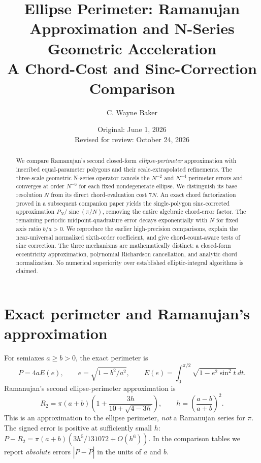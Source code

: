 \documentclass[11pt]{article}
\title{Ellipse Perimeter: Ramanujan Approximation and N-Series Geometric Acceleration\\\large A Chord-Cost and Sinc-Correction Comparison}
\author{C. Wayne Baker}
\date{Original: June 1, 2026\\Revised for review: October 24, 2026}
\begin{document}
\maketitle
\begin{abstract}
We compare Ramanujan's second closed-form \emph{ellipse-perimeter} approximation with inscribed equal-parameter polygons and their scale-extrapolated refinements. The three-scale geometric N-series operator cancels the $N^{-2}$ and $N^{-4}$ perimeter errors and converges at order $N^{-6}$ for each fixed nondegenerate ellipse. We distinguish its base resolution $N$ from its direct chord-evaluation cost $7N$. An exact chord factorization proved in a subsequent companion paper yields the single-polygon sinc-corrected approximation $P_N/\operatorname{sinc}(\pi/N)$, removing the entire algebraic chord-error factor. The remaining periodic midpoint-quadrature error decays exponentially with $N$ for fixed axis ratio $b/a>0$. We reproduce the earlier high-precision comparisons, explain the near-universal normalized sixth-order coefficient, and give chord-count-aware tests of sinc correction. The three mechanisms are mathematically distinct: a closed-form eccentricity approximation, polynomial Richardson cancellation, and analytic chord normalization. No numerical superiority over established elliptic-integral algorithms is claimed.
\end{abstract}
\section{Exact perimeter and Ramanujan's approximation}
For semiaxes $a\ge b>0$, the exact perimeter is
\begin{equation}\label{eq:exact}
P=4aE(e),\qquad e=\sqrt{1-b^2/a^2},\qquad E(e)=\int_0^{\pi/2}\sqrt{1-e^2\sin^2 t}\,dt.
\end{equation}
Ramanujan's second ellipse-perimeter approximation is
\begin{equation}\label{eq:ram}
R_2=\pi(a+b)\left(1+\frac{3h}{10+\sqrt{4-3h}}\right),\qquad h=\left(\frac{a-b}{a+b}\right)^2.
\end{equation}
This is an approximation to the ellipse perimeter, \emph{not} a Ramanujan series for $\pi$. The signed error is positive at sufficiently small $h$: $P-R_2=\pi(a+b)(3h^5/131072+O(h^6))$. In the comparison tables we report \emph{absolute} errors $|P-\widetilde P|$ in the units of $a$ and $b$.
\end{document}
